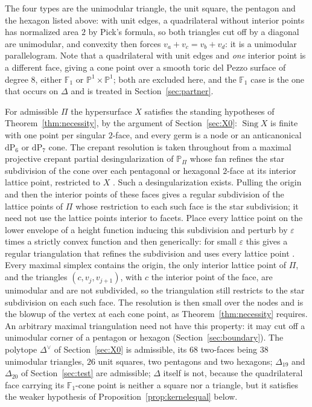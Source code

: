 \documentclass[11pt]{amsart}
\theoremstyle{definition}
\theoremstyle{remark}
\theoremstyle{plain}
\newcommand{\PP}{\mathbb{P}}
\newcommand{\Sing}{\operatorname{Sing}}
\newcommand{\dP}{\mathrm{dP}}
\begin{document}
The four types are the unimodular triangle, the unit square, the pentagon
and the hexagon listed above: with unit edges, a quadrilateral
without interior points has normalized area $2$ by Pick's formula, so
both triangles cut off by a diagonal are unimodular, and convexity then
forces $v_a+v_c=v_b+v_d$: it is a unimodular parallelogram.  Note that a quadrilateral with unit edges
and \emph{one} interior point is a different face, giving a cone point over
a smooth toric del Pezzo surface of degree $8$, either $\mathbb F_1$ or
$\PP^1\times\PP^1$; both are excluded here, and the $\mathbb F_1$ case is the
one that occurs on $\Delta$ and is treated in Section~\ref{sec:partner}.

For admissible $\Pi$ the hypersurface $X$ satisfies the standing
hypotheses of Theorem~\ref{thm:necessity}, by the argument of
Section~\ref{sec:X0}: $\Sing X$ is finite with one point per singular
$2$-face, and every germ is a node or an anticanonical $\dP_6$ or
$\dP_7$ cone.  The crepant resolution is taken throughout from a maximal
projective crepant partial desingularization of $\PP_{\Pi}$
\cite[\S2.2]{Batyrev94} whose fan refines the star subdivision of the cone
over each pentagonal or hexagonal $2$-face at its interior lattice point,
restricted to $X$ \cite[\S4.2]{Batyrev94}.  Such a desingularization exists.
Pulling the origin and then the interior points of these faces gives a
regular subdivision of the lattice points of $\Pi$ \cite[Lemma~4.3.12]{DLRS10}
whose restriction to each such face is the star subdivision; it need not use
the lattice points interior to facets.  Place every lattice point on the lower
envelope of a height function inducing this subdivision and perturb by
$\varepsilon$ times a strictly convex function and then generically: for small
$\varepsilon$ this gives a regular triangulation that refines the subdivision
and uses every lattice point \cite[Lemma~2.3.16]{DLRS10}.  Every maximal simplex
contains the origin, the only interior lattice point of $\Pi$, and the
triangles $(c,v_j,v_{j+1})$, with $c$ the interior point of the face, are
unimodular and are not subdivided, so the triangulation still restricts to the
star subdivision on each such face.  The
resolution is then small over the nodes and is the blowup of the vertex at
each cone point, as Theorem~\ref{thm:necessity} requires.  An arbitrary
maximal triangulation need not have this property: it may cut off a
unimodular corner of a pentagon or hexagon (Section~\ref{sec:boundary}).  The polytope $\Delta^{\vee}$ of Section~\ref{sec:X0} is
admissible, its $68$ two-faces being $38$ unimodular triangles, $26$ unit
squares, two pentagons and two hexagons; $\Delta_{19}$ and $\Delta_{20}$
of Section~\ref{sec:test} are admissible; $\Delta$ itself is not, because
the quadrilateral face carrying its $\mathbb F_1$-cone point is neither a
square nor a triangle, but it satisfies the weaker hypothesis of
Proposition~\ref{prop:kernelequal} below.
\end{document}
